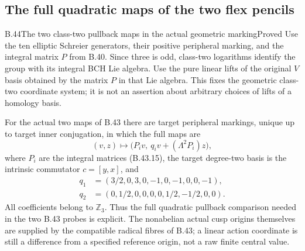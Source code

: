 \subsection{The full quadratic maps of the two flex pencils}

\begin{statement}{B.44}{The two class-two pullback maps in the actual geometric marking}{Proved}
Use the ten elliptic Schreier generators, their positive peripheral
marking, and the integral matrix $P$ from B.40.  Since three is odd,
class-two logarithms identify the group with its integral BCH Lie
algebra.  Use the pure linear lifts of the original $V$ basis obtained
by the matrix $P$ in that Lie algebra.  This fixes the geometric
class-two coordinate system; it is not an assertion about arbitrary
choices of lifts of a homology basis.

For the actual two maps of B.43 there are target peripheral markings,
unique up to target inner conjugation, in which the full maps are
\[
 (v,z)\longmapsto
 \bigl(P_i v,\ q_i v+(\Lambda^2P_i)z\bigr),                \tag{B.44.1}
\]
where $P_i$ are the integral matrices (B.43.15), the target degree-two
basis is the intrinsic commutator $c=[y,x]$, and
\[
 \begin{split}
 q_1&=(3/2,0,3,0,-1,0,-1,0,0,-1),\\
 q_2&=(0,1/2,0,0,0,0,1/2,-1/2,0,0).
 \end{split}                                                \tag{B.44.2}
\]
All coefficients belong to $\mathbb Z_3$.  Thus the full quadratic
pullback comparison needed in the two B.43 probes is explicit.
The nonabelian actual cusp origins themselves are supplied by the
compatible radical fibres of B.43; a linear action coordinate is
still a difference from a specified reference origin, not a raw
finite central value.
\end{statement}
